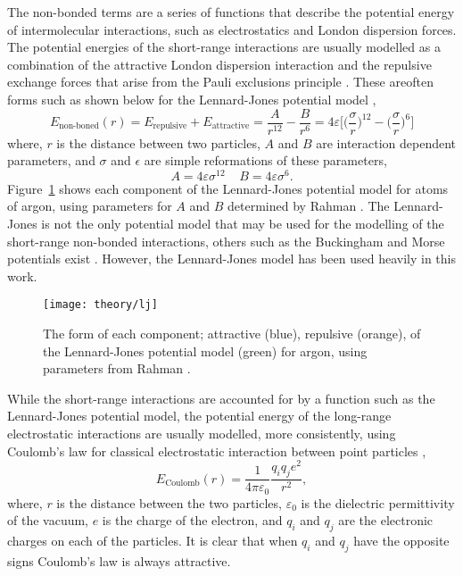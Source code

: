 The non-bonded terms are a series of functions that describe the potential energy of intermolecular interactions, such as electrostatics and London dispersion forces.
The potential energies of the short-range interactions are usually modelled as a combination of the attractive London dispersion interaction and the repulsive exchange forces that arise from the Pauli exclusions principle \cite{leach_molecular_1996}.
These areoften forms such as shown below for the Lennard-Jones potential model \cite{lennard-jones_determination_1924},
%
\begin{equation}
  E_{\text{non-boned}}(r) = E_{\text{repulsive}} + E_{\text{attractive}} = \frac{A}{r^{12}} - \frac{B}{r^6} = 4\varepsilon\Bigg[\bigg(\frac{\sigma}{r}\bigg)^{12} - \bigg(\frac{\sigma}{r}\bigg)^6\Bigg]
\end{equation}
%
where, $r$ is the distance between two particles, $A$ and $B$ are interaction dependent parameters, and $\sigma$ and $\epsilon$ are simple reformations of these parameters,
%
\begin{equation}
  A = 4\varepsilon\sigma^{12} \;\;\;\; B = 4\varepsilon\sigma^6.
\end{equation}
%
Figure~\ref{fig:lj} shows each component of the Lennard-Jones potential model for atoms of argon, using parameters for $A$ and $B$ determined by Rahman \cite{rahman_correlations_1964}.
The Lennard-Jones is not the only potential model that may be used for the modelling of the short-range non-bonded interactions, others such as the Buckingham and Morse potentials exist \cite{buckingham_classical_1938, morse_diatomic_1929}.
However, the Lennard-Jones model has been used heavily in this work.
%
\begin{figure}
    \centering
    \texttt{[image: theory/lj]}
    \caption{The form of each component; attractive (blue), repulsive (orange), of the Lennard-Jones potential model (green) for argon, using parameters from Rahman \cite{rahman_correlations_1964}.}
    \label{fig:lj}
\end{figure}
%

While the short-range interactions are accounted for by a function such as the Lennard-Jones potential model, the potential energy of the long-range electrostatic interactions are usually modelled, more consistently, using Coulomb's law for classical electrostatic interaction between point particles \cite{coulomb_premier_1788, coulomb_second_1788},
%
\begin{equation}
  E_{\text{Coulomb}}(r) = \frac{1}{4\pi\varepsilon_0}{\frac{q_iq_je^2}{r^2}},
\end{equation}
%
where, $r$ is the distance between the two particles, $\varepsilon_0$ is the dielectric permittivity of the vacuum, $e$ is the charge of the electron, and $q_i$ and $q_j$ are the electronic charges on each of the particles.
It is clear that when $q_i$ and $q_j$ have the opposite signs Coulomb's law is always attractive.

